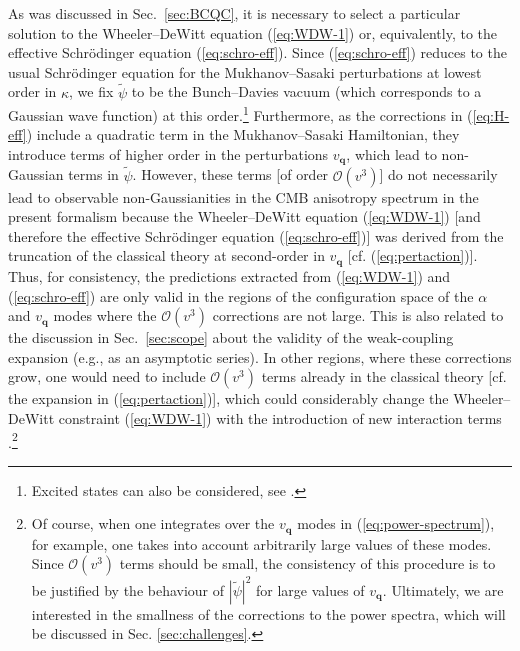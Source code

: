 \documentclass[12pt]{iopart}
\def\eref#1{(\ref{eq:#1})}
\def\Ob{\mathcal{O}}
\def\q{\mathbf{q}}
\begin{document}
As was discussed in Sec.~\ref{sec:BCQC}, it is necessary to select a particular solution to the Wheeler--DeWitt equation \eref{WDW-1} or, equivalently, to the effective Schr\"odinger equation \eref{schro-eff}. Since \eref{schro-eff} reduces to the usual Schr\"odinger equation for the Mukhanov--Sasaki perturbations at lowest order in $\kappa$, we fix $\tilde{\psi}$ to be the Bunch--Davies vacuum (which corresponds to a Gaussian wave function) at this order.\footnote{Excited states can also be considered, see \citet{Brizuela:2019jzv}.} Furthermore, as the corrections in \eref{H-eff} include a quadratic term in the Mukhanov--Sasaki Hamiltonian, they introduce terms of higher order in the perturbations $v_{\q}$, which lead to non-Gaussian terms in $\tilde{\psi}$. However, these terms [of order $\Ob(v^3)$] do not necessarily lead to observable non-Gaussianities in the CMB anisotropy spectrum in the present formalism because the Wheeler--DeWitt equation \eref{WDW-1} [and therefore the effective Schr\"odinger equation \eref{schro-eff}] was derived from the truncation of the classical theory at second-order in $v_{\q}$ [cf. \eref{pertaction}]. Thus, for consistency, the predictions extracted from \eref{WDW-1} and \eref{schro-eff} are only valid in the regions of the configuration space of the $\alpha$ and $v_{\q}$ modes where the $\Ob(v^3)$ corrections are not large. This is also related to the discussion in Sec.~\ref{sec:scope} about the validity of the weak-coupling expansion (e.g., as an asymptotic series). In other regions, where these corrections grow, one would need to include $\Ob(v^3)$ terms already in the classical theory [cf. the expansion in \eref{pertaction}], which could considerably change the Wheeler--DeWitt constraint \eref{WDW-1} with the introduction of new interaction terms \citep{deAlwis:2018sec,Chataignier:2020fap}.\footnote{Of course, when one integrates over the $v_{\q}$ modes in \eref{power-spectrum}, for example, one takes into account arbitrarily large values of these modes. Since $\Ob(v^3)$ terms should be small, the consistency of this procedure is to be justified by the behaviour of $|\tilde{\psi}|^2$ for large values of $v_{\q}$. Ultimately, we are interested in the smallness of the corrections to the power spectra, which will be discussed in Sec. \ref{sec:challenges}.}
\end{document}
